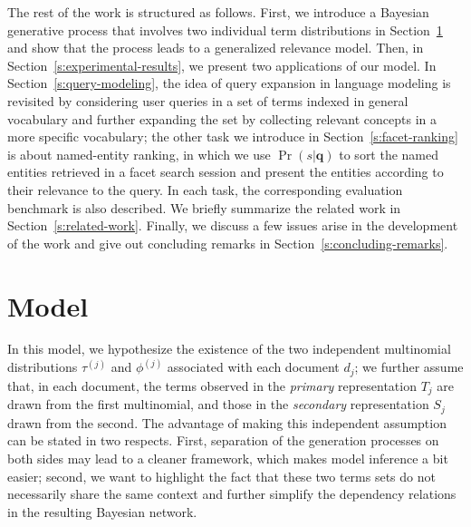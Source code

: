 The rest of the work is structured as follows.  First, we introduce a Bayesian
generative process that involves two individual term distributions in
Section~\ref{s:model} and show that the process leads to a generalized relevance
model.  Then, in Section~\ref{s:experimental-results}, we present two
applications of our model.  In Section~\ref{s:query-modeling}, the idea of
query expansion in language modeling is revisited by considering user queries
in a set of terms indexed in general vocabulary and further expanding the set
by collecting relevant concepts in a more specific vocabulary; the other task
we introduce in Section~\ref{s:facet-ranking} is about named-entity ranking, in
which we use $\Pr(s|\mathbf{q})$ to sort the named entities retrieved in a facet search
session and present the entities according to their relevance to the query.  In
each task, the corresponding evaluation benchmark is also described.  We
briefly summarize the related work in Section~\ref{s:related-work}.  Finally,
we discuss a few issues arise in the development of the work and give out
concluding remarks in Section~\ref{s:concluding-remarks}.


\section{Model}\label{s:model}

In this model, we hypothesize the existence of the two independent multinomial
distributions $\tau^{(j)}$ and $\phi^{(j)}$ associated with each document
$d_j$; we further assume that, in each document, the terms observed in the
\emph{primary} representation $T_j$ are drawn from the first multinomial, and
those in the \emph{secondary} representation $S_j$ drawn from the second.  The
advantage of making this independent assumption can be stated in two respects.
First, separation of the generation processes on both sides may lead to a
cleaner framework, which makes model inference a bit easier; second, we want to
highlight the fact that these two terms sets do not necessarily share the same
context and further simplify the dependency relations in the resulting Bayesian
network.  

